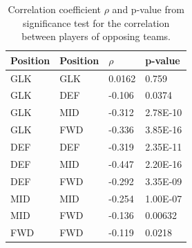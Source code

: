 \begin{table}[H]
\centering
\begin{tabular}{|l|l|l|l|}
\hline
Position & Position & $\rho$    & p-value  \\
\hline
GLK      & GLK      & 0.0162 & 0.759    \\
GLK      & DEF      & -0.106 & 0.0374   \\
GLK      & MID      & -0.312 & 2.78E-10 \\
GLK      & FWD      & -0.336 & 3.85E-16 \\
DEF      & DEF      & -0.319 & 2.35E-11 \\
DEF      & MID      & -0.447 & 2.20E-16 \\
DEF      & FWD      & -0.292 & 3.35E-09 \\
MID      & MID      & -0.254 & 1.00E-07 \\
MID      & FWD      & -0.136 & 0.00632 \\
FWD      & FWD      & -0.119 & 0.0218  \\
\hline
\end{tabular}
\caption{Correlation coefficient $\rho$ and p-value from significance test for the correlation between players of opposing teams.}
\label{tab:cor_opp}
\end{table}